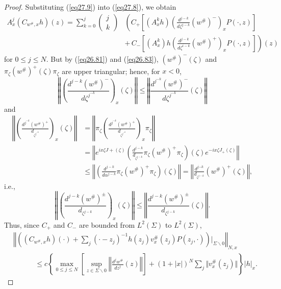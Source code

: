 \documentclass{surv-l}
\theoremstyle{plain}
\theoremstyle{definition}
\numberwithin{equation}{chapter}
\begin{document}
\begin{proof}
Substituting (\ref{eq27.9}) into (\ref{eq27.8}), we obtain
\begin{align}\label{eq27.10}
A_{x}^{j}(C_{w^{\#},x}h)(z)=\sum_{k=0}^{j} \left(\begin{array}{l}
j\\
k
\end{array}\right)& \left(C_{+}\left[(A_{x}^{k}h) \left(\frac{d^{j-k}}{d{\zeta}^{j-k}}(w^{\#})^{-}\right)_{x}P(\cdot,z)\right]\right.\\ \nonumber
&\left. +\,C_{-}\left[(A_{x}^{k})h\left(\frac{d^{j-k}}{d\zeta^{i-k}}(w^{\#})^{+}\right)_{x}P(\cdot, z)\right]\right)(z)
\end{align}
for $0\leq j\leq N$. But by (\ref{eq26.81}) and (\ref{eq26.83}), $(w^{\#})^{-}(\zeta)$ and $\pi_{\zeta}(w^{\#})^{+}(\zeta)\pi_{\zeta}$ are upper triangular; hence, for $x<0$,
\begin{equation*}
\left\Vert\left(\frac{d^{j-k}(w^{\#})^{-}}{d{\zeta^{j^{-k}}}}\right)_{x}(\zeta)\right\Vert\leq\left\Vert\frac{d^{j^{-k}}(w^{\#})^{-}}{d{\zeta^{j^{-k}}}}(\zeta)\right\Vert
\end{equation*}
and
\begin{align*}
\left\Vert\left(\frac{d^{j^{-k}}(w^{\#})^{+}}{d_{\zeta^{j^{-k}}}}\right)_{x}(\zeta)\right\Vert &=\left\Vert\pi_{\zeta}\left(\frac{d^{j^{-k}}(w^{\#})^{+}}{d_{\zeta^{j^{-k}}}}\right)_{x}\pi_{\zeta}\right\Vert\\
&=\left\Vert e^{ix\zeta{J}+(\zeta)}\left(\frac{d^{j-k}}{d_{\zeta^{j-k}}}\pi_{\zeta}(w^{\#})^{+}\pi_{\zeta}\right)(\zeta)e^{-ix\zeta{J_{+}(\zeta)}}\right\Vert\\
&\leq\left\Vert\left(\frac{d^{j-k}}{d\alpha^{j-k}}\pi_{\zeta}(w^{\#})^{+}\pi_{\zeta}\right)(\zeta)\right\Vert=\left\Vert\frac{d^{j{-k}}}{d_{\zeta^{j-k}}}
(w^{\#})^{+}(\zeta)\right\Vert,
\end{align*}
i.e.,
\begin{equation}\label{eq27.11}
\left\Vert\left(\frac{d^{j-k}(w^{\#})^{\pm}}{d_{\zeta^{j-k}}}\right)_{x}(\zeta)\right\Vert\leq\left\Vert\frac{d^{j-k}(w^{\#})^{\pm}}{d_{\zeta^{j-k}}}(\zeta)\right\Vert.
\end{equation}
Thus, since $C_{+}$ and $C_{-}$ are bounded from $L^{2}(\Sigma)$ to $L^{2}(\Sigma)$,
\begin{align*}
&\left\Vert \left((C_{w^{\#},x}h)(\cdot)+\sum_{j}(\cdot-z_{j})^{-1}h(z_{j})v_{x}^{\#}(z_{j})P(z_{j}, \cdot)\right)\bigg|_{\Sigma\backslash 0}\right\Vert_{N,x}\\
& \qquad\quad\leq c\left\{\max_{0\leq j\leq N}\left[\sup_{z\in\Sigma\backslash 0}\left\Vert\frac{d^{j}w^{\#}}{dz^{j}}(z)\right\Vert\right]+(1+|x|)^{N}\sum_{j}\Vert v_{x}^{\#}(z_{j})\Vert\right\}|h|_{x}.

\end{align*}
\end{proof}
\end{document}
